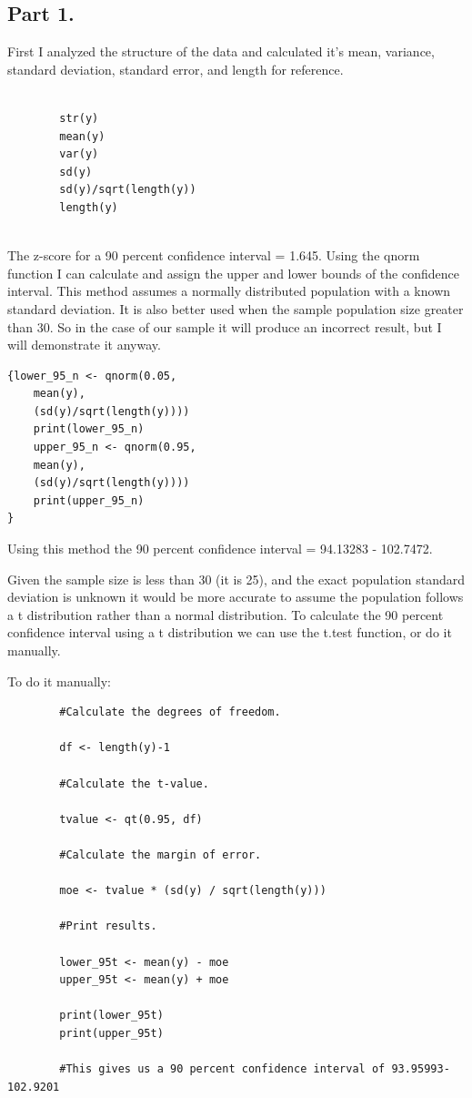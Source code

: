 \documentclass[12pt,letterpaper]{article}
\begin{document}
	\subsection*{Part 1.}
	
	First I analyzed the structure of the data and calculated it's mean, variance, standard deviation, standard error, and length for reference.  
	
	\begin{verbatim}
		
		str(y)
		mean(y) 
		var(y) 
		sd(y) 
		sd(y)/sqrt(length(y)) 
		length(y)
		
	\end{verbatim}
	
	The z-score for a 90 percent confidence interval = 1.645. Using the qnorm function I can calculate and assign the upper and lower bounds of the confidence interval. This method assumes a normally distributed population with a known standard deviation. It is also better used when the sample population size greater than 30. So in the case of our sample it will produce an incorrect result, but I will demonstrate it anyway.
	
	\begin{Verbatim}
{lower_95_n <- qnorm(0.05, 
	mean(y), 
	(sd(y)/sqrt(length(y))))
	print(lower_95_n)
	upper_95_n <- qnorm(0.95,
	mean(y),
	(sd(y)/sqrt(length(y))))
	print(upper_95_n)
}
	\end{Verbatim}
	
	Using this method the 90 percent confidence interval = 94.13283 - 102.7472.
	\vspace{5mm}
	
	Given the sample size is less than 30 (it is 25), and the exact population standard deviation is unknown it would be more accurate to assume the population follows a t distribution rather than a normal distribution. To calculate the 90 percent confidence interval using a t distribution we can use the t.test function, or do it manually.
	\vspace{5mm}
	
	To do it manually:
	
	\begin{Verbatim}
		#Calculate the degrees of freedom.
		
		df <- length(y)-1
		
		#Calculate the t-value.
		
		tvalue <- qt(0.95, df)
		
		#Calculate the margin of error.
		
		moe <- tvalue * (sd(y) / sqrt(length(y)))
		
		#Print results.
		
		lower_95t <- mean(y) - moe
		upper_95t <- mean(y) + moe
		
		print(lower_95t)
		print(upper_95t)
		
		#This gives us a 90 percent confidence interval of 93.95993-102.9201
	\end{Verbatim}
	
\end{document}
